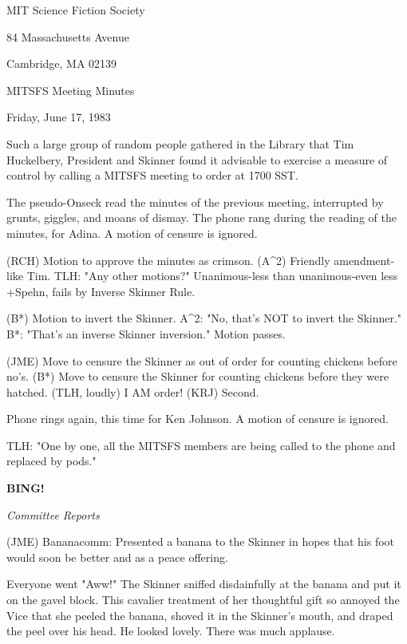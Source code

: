 \documentclass[12pt]{article}
\newcommand{\bing}{{\bf BING!} }
\newcommand{\goto}[1]{\bing \vskip 12pt \centerline{{\em{#1}}}}
\begin{document}
\begin{center}

MIT Science Fiction Society 

84 Massachusetts Avenue

Cambridge, MA 02139

\vspace{12pt}

MITSFS Meeting Minutes 

Friday, June 17, 1983

\end{center}
 
\vspace{18pt}

\setlength{\parskip}{6pt}

\noindent
Such a large group of random people gathered in the Library that Tim Huckelbery, President and Skinner found it advisable to exercise a measure of control by calling a MITSFS meeting to order at 1700 SST.

The pseudo-Onseck read the minutes of the previous meeting, interrupted by grunts, giggles, and moans of dismay. The phone rang during the reading of the minutes, for Adina. A motion of censure is ignored.

(RCH) Motion to approve the minutes as crimson. (A^2) Friendly amendment- like Tim. TLH: "Any other motions?" Unanimous-less than unanimous-even less +Spehn, fails by Inverse Skinner Rule.

(B*) Motion to invert the Skinner. A^2: "No, that's NOT to invert the Skinner." B*: "That's an inverse Skinner inversion." Motion passes.

(JME) Move to censure the Skinner as out of order for counting chickens before no's. (B*) Move to censure the Skinner for counting chickens before they were hatched. (TLH, loudly) I AM order! (KRJ) Second.

Phone rings again, this time for Ken Johnson. A motion of censure is ignored.

TLH: "One by one, all the MITSFS members are being called to the phone and replaced by pods."

\goto{Committee Reports}

(JME) Bananacomm: Presented a banana to the Skinner in hopes that his foot would soon be better and as a peace offering.

Everyone went "Aww!" The Skinner sniffed disdainfully at the banana and put it on the gavel block. This cavalier treatment of her thoughtful gift so annoyed the Vice that she peeled the banana, shoved it in the Skinner's mouth, and draped the peel over his head. He looked lovely. There was much applause.
\end{document}
